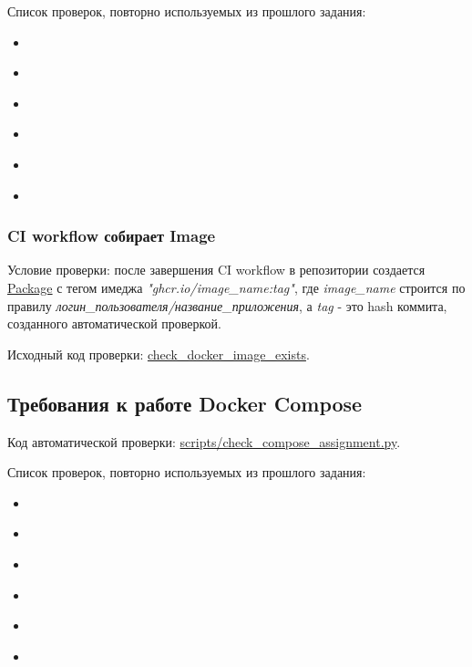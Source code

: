 \documentclass[12pt,a4paper]{article}
\begin{document}
Список проверок, повторно используемых из прошлого задания:
\begin{itemize}
    \item ~
    \item ~
    \item ~
    \item ~
    \item ~
    \item ~
\end{itemize}

\subsubsection{CI workflow собирает Image}
\label{sec:image-created}
Условие проверки: после завершения CI workflow в репозитории создается \href{https://docs.github.com/en/packages/working-with-a-github-packages-registry/working-with-the-container-registry}{Package}
с тегом имеджа \textit{"ghcr.io/{image\_name}:{tag}"}, где \textit{image\_name} строится по правилу \textit{логин\_пользователя/название\_приложения}, а \textit{tag} - это hash коммита, созданного автоматической проверкой.

Исходный код проверки: \href{https://github.com/search?q=repo%3Aprafdin%2Fcheck-assignment+check_docker_image_exists+path%3A%2F%5Echecker%5C%2F%2F&type=code}{check\_docker\_image\_exists}.

\subsection{Требования к работе Docker Compose}
Код автоматической проверки: \href{https://github.com/search?q=repo%3Aprafdin%2Fcheck-assignment%20check_compose_assignment.py&type=code}
{scripts/check\_compose\_assignment.py}.

Список проверок, повторно используемых из прошлого задания:
\begin{itemize}
    \item ~
    \item ~
    \item ~
    \item ~
    \item ~
    \item ~
\end{itemize}
\end{document}
